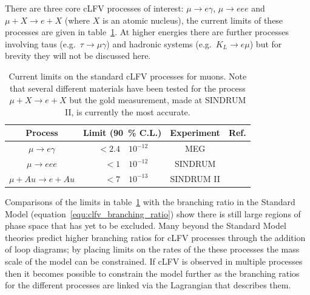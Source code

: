 There are three core cLFV processes of interest: \( \mu\rightarrow e\gamma \), \( \mu\rightarrow eee \) and  \(\mu+X\rightarrow e+X \) (where \(X\) is an atomic nucleus), the current limits of these processes are given in table~\ref{tab:clfv}. At higher energies there are further processes involving taus (e.g.\ \(\tau\rightarrow\mu\gamma\)) and hadronic systems (e.g.\ \(K_L\rightarrow e\mu\)) but for brevity they will not be discussed here. 
\begin{table}
  \begin{center}
  \begin{tabular}{c | r@{\( \times \)}l | c | c}
    Process                     &  \multicolumn{2}{c|}{Limit (90~\% C.L.)}  &  Experiment  & Ref.\\
    \hline
    \(\mu\rightarrow e\gamma\)  &  \(<2.4\) & \(10^{-12}\)  &  MEG         & \cite{meg_mu_e_gamma} \\
    \(\mu\rightarrow eee\)      &    \(<1\) & \(10^{-12}\)  &  SINDRUM     & \cite{sindrum_1_mu_eee} \\
    \(\mu+Au\rightarrow e+Au\)  &    \(<7\) & \(10^{-13}\)  &  SINDRUM II  & \cite{sindrum_2_mu_ag_e}\\
    
  \end{tabular}
  \end{center}
  \caption{Current limits on the standard cLFV processes for muons. Note that several different materials have been tested for the process \( \mu + X\rightarrow e + X \) but the gold measurement, made at SINDRUM II, is currently the most accurate.}
  \label{tab:clfv}
\end{table}

Comparisons of the limits in table~\ref{tab:clfv} with the branching ratio in the Standard Model (equation~\eqref{equ:clfv_branching_ratio}) show there is still large regions of phase space that has yet to be excluded. Many beyond the Standard Model theories predict higher branching ratios for cLFV processes through the addition of loop diagrams; by placing limits on the rates of the these processes the mass scale of the model can be constrained. If cLFV is observed in multiple processes then it becomes possible to constrain the model further as the branching ratios for the different processes are linked via the Lagrangian that describes them.

